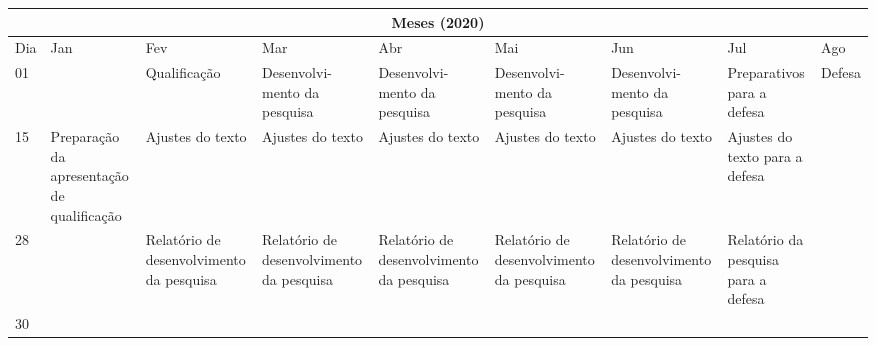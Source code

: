 	\setlength{\tabcolsep}{6pt}
	\begin{table}[h]
		\scriptsize
		\begin{tabular}{|p{0.28cm}|>{\raggedright}p{1.3cm}|>{\raggedright}p{1.4cm}|>{\raggedright}p{1.4cm}|p{1.4cm}|p{1.4cm}|p{1.5cm}|p{1.5cm}|p{1.5cm}|}
	\hline
	\multicolumn{9}{|c|}{Meses (2020)}\\
	\hline
	 Dia &Jan & Fev & Mar & Abr & Mai & Jun & Jul & Ago \\
	 \hline
	 01 &  & Qualifica\c c\~ao & Desenvolvi-mento da pesquisa & Desenvolvi-mento da pesquisa  & Desenvolvi-mento da
	 pesquisa  & Desenvolvi-mento da pesquisa   & Preparativos para a defesa & Defesa\\[1.0cm]
	 \hline
	 15 & Prepara\c c\~ao da apresenta\c c\~ao de qualifica\c c\~ao & Ajustes  do texto  &Ajustes  do texto  & Ajustes
	 do texto &Ajustes  do texto & Ajustes  do texto  & Ajustes do texto para a defesa&\\[1.2cm]
	 \hline
	 28 &  & Relat\'orio de desenvolvimento da pesquisa & Relat\'orio de desenvolvimento da pesquisa & Relat\'orio de
	 desenvolvimento da pesquisa&Relat\'orio de desenvolvimento da pesquisa & Relat\'orio de desenvolvimento da pesquisa
	 & Relat\'orio da pesquisa para a defesa&\\[1.2cm]
	 \hline
	 30 &  &   &  & & &  &  &\\
	\hline
	\end{tabular}
\end{table}


